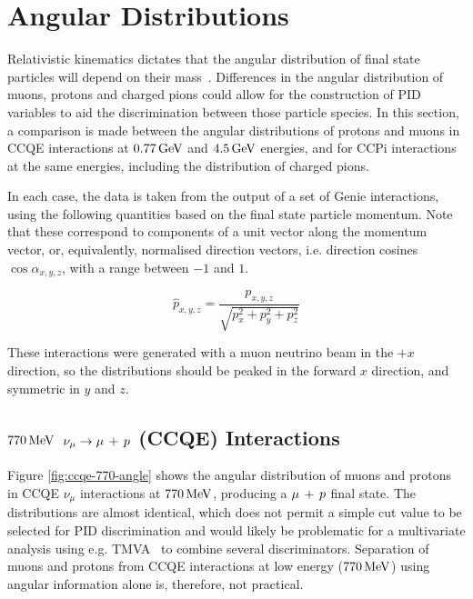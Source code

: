 \section{Angular Distributions}
Relativistic kinematics dictates that the angular distribution of final state particles will depend on their mass~\citep{PDG2012}. Differences in the angular distribution of muons, protons and charged pions could allow for the construction of PID variables to aid the discrimination between those particle species. In this section, a comparison is made between the angular distributions of protons and muons in \acs{CCQE} interactions at $0.77\,\mathrm{GeV}$ and $4.5\,\mathrm{GeV}$ energies, and for \acs{CCPi} interactions at the same energies, including the distribution of charged pions.

In each case, the data is taken from the output of a set of Genie interactions, using the following quantities based on the final state particle momentum. Note that these correspond to components of a unit vector along the momentum vector, or, equivalently, normalised direction vectors, i.e. direction cosines $\cos\alpha_{x,y,z}$, with a range between $-1$ and $1$.

\begin{equation}\label{eqn:angular_variables}
    \hat{p}_{x,y,z} = \frac{p_{x,y,z}}{\sqrt{p_x^2 + p_y^2 + p_z^2}}
\end{equation}

These interactions were generated with a muon neutrino beam in the $+x$ direction, so the distributions should be peaked in the forward $x$ direction, and symmetric in $y$ and $z$.

\subsection{$770\,\mathrm{MeV}$ $\nu_\mu \rightarrow \mu\,+\,p$ (CCQE) Interactions}
Figure \ref{fig:ccqe-770-angle} shows the angular distribution of muons and protons in \acs{CCQE} $\nu_\mu$ interactions at $770\,\mathrm{MeV}$, producing a $\mu\,+\,p$ final state. The distributions are almost identical, which does not permit a simple cut value to be selected for PID discrimination and would likely be problematic for a multivariate analysis using e.g. TMVA~\citep{TMVA} to combine several discriminators. Separation of muons and protons from \acs{CCQE} interactions at low energy ($770\,\mathrm{MeV}$) using angular information alone is, therefore, not practical.

